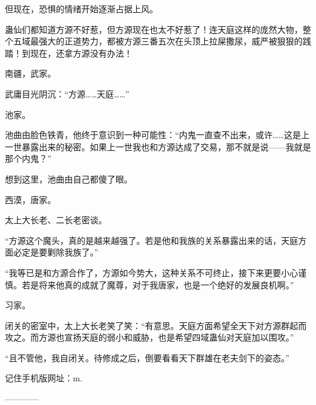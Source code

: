 \begin{this_body}
但现在，恐惧的情绪开始逐渐占据上风。

蛊仙们都知道方源不好惹，但方源现在也太不好惹了！连天庭这样的庞然大物，整个五域最强大的正道势力，都被方源三番五次在头顶上拉屎撒尿，威严被狠狠的践踏！到现在，还拿方源没有办法！

南疆，武家。

武庸目光阴沉：“方源……天庭……”

池家。

池曲由脸色铁青，他终于意识到一种可能性：“内鬼一直查不出来，或许……这是上一世暴露出来的秘密。如果上一世我也和方源达成了交易，那不就是说——我就是那个内鬼？”

想到这里，池曲由自己都傻了眼。

西漠，唐家。

太上大长老、二长老密谈。

“方源这个魔头，真的是越来越强了。若是他和我族的关系暴露出来的话，天庭方面必定是要剿除我族了。”

“我等已是和方源合作了，方源如今势大，这种关系不可终止，接下来更要小心谨慎。若是将来他真的成就了魔尊，对于我唐家，也是一个绝好的发展良机啊。”

习家。

闭关的密室中，太上大长老笑了笑：“有意思。天庭方面希望全天下对方源群起而攻之。而方源也宣扬天庭的弱小和威胁，也是希望四域蛊仙对天庭加以围攻。”

“且不管他，我自闭关。待修成之后，倒要看看天下群雄在老夫剑下的姿态。”

记住手机版网址：m.

------------

\end{this_body}

